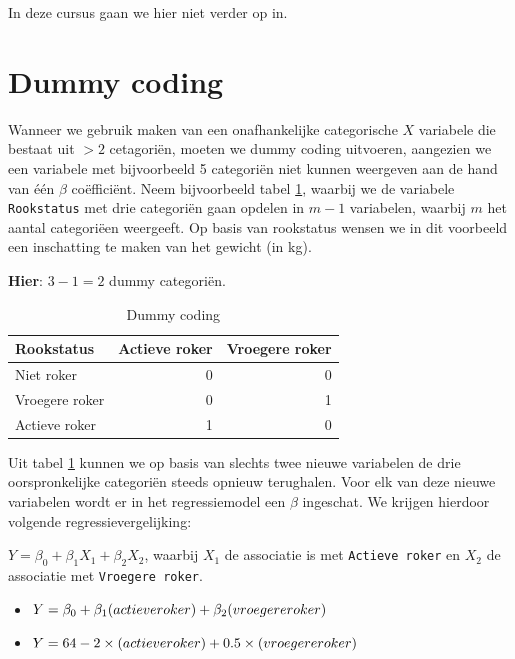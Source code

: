 \documentclass[
]{book}
\providecommand{\tightlist}{%
  \setlength{\itemsep}{0pt}\setlength{\parskip}{0pt}}
\theoremstyle{definition}
\theoremstyle{definition}
\theoremstyle{definition}
\theoremstyle{definition}
\theoremstyle{remark}
\begin{document}
In deze cursus gaan we hier niet verder op in.

\hypertarget{dummy-coding}{%
\section*{Dummy coding}\label{dummy-coding}}


Wanneer we gebruik maken van een onafhankelijke categorische \(X\) variabele die bestaat uit \(>2\) cetagoriën, moeten we dummy coding uitvoeren, aangezien we een variabele met bijvoorbeeld 5 categoriën niet kunnen weergeven aan de hand van één \(\beta\) coëfficiënt. Neem bijvoorbeeld tabel \ref{tab:dummy1}, waarbij we de variabele \texttt{Rookstatus} met drie categoriën gaan opdelen in \(m-1\) variabelen, waarbij \(m\) het aantal categoriëen weergeeft. Op basis van rookstatus wensen we in dit voorbeeld een inschatting te maken van het gewicht (in kg).

\textbf{Hier}: \(3-1 = 2\) dummy categoriën.

\begin{table}

\caption{\label{tab:dummy1}Dummy coding}
\centering
\begin{tabular}[t]{lrr}
\toprule
Rookstatus & Actieve roker & Vroegere roker\\
\midrule
Niet roker & 0 & 0\\
Vroegere roker & 0 & 1\\
Actieve roker & 1 & 0\\
\bottomrule
\end{tabular}
\end{table}

Uit tabel \ref{tab:dummy1} kunnen we op basis van slechts twee nieuwe variabelen de drie oorspronkelijke categoriën steeds opnieuw terughalen. Voor elk van deze nieuwe variabelen wordt er in het regressiemodel een \(\beta\) ingeschat. We krijgen hierdoor volgende regressievergelijking:

\(Y = \beta_0 + \beta_1 X_1 + \beta_2 X_2\), waarbij \(X_1\) de associatie is met \texttt{Actieve\ roker} en \(X_2\) de associatie met \texttt{Vroegere\ roker}.

\begin{itemize}
\tightlist
\item
  \(Y = \beta_0 + \beta_1 (actieve \space roker) + \beta_2 (vroegere \space roker)\)
\item
  \(Y = 64 - 2 \times (actieve \space roker) + 0.5 \times (vroegere \space roker)\)
\end{itemize}
\end{document}
